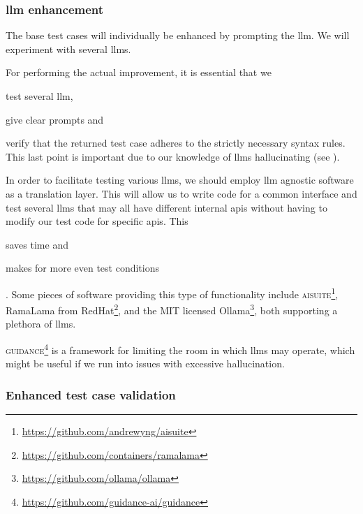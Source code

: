 \subsubsection{\acrshort{llm} enhancement}\label{sec:llmEnhancement}

The base test cases will individually be enhanced by prompting the
\acrshort{llm}. We will experiment with several \acrshort{llms}.

For performing the actual improvement, it is essential that we \begin{inparaenum}
    \item test several \acrshort{llm},
    \item give clear prompts
    and
    \item verify that the returned test case adheres to the strictly necessary
    syntax rules. This last point is important due to our knowledge of
    \acrshort{llms} hallucinating (see ).
\end{inparaenum}

In order to facilitate testing various \acrlong{llms}, we should employ
\acrshort{llm} agnostic software as a translation layer. This will allow us to
write code for a common interface and test several \acrshort{llms} that may all
have different internal \acrfull{apis} without having to modify our test code
for specific \acrshort{apis}. This \begin{inparaenum}
    \item saves time
    and
    \item makes for more even test conditions \end{inparaenum}. Some pieces of software providing
this type of functionality include
\textsc{aisuite}\footnote{\url{https://github.com/andrewyng/aisuite}}, RamaLama from
RedHat\footnote{\url{https://github.com/containers/ramalama}}, and the MIT licensed
Ollama\footnote{\url{https://github.com/ollama/ollama}}, both supporting a plethora of
\acrlong{llms}.

\textsc{guidance}\footnote{\url{https://github.com/guidance-ai/guidance}} is a
framework for limiting the room in which \acrshort{llms} may operate, which
might be useful if we run into issues with excessive hallucination.


\subsubsection{Enhanced test case validation}

